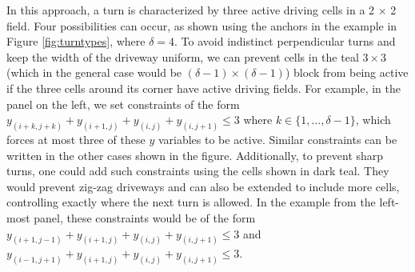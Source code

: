 \documentclass[10pt]{article}
\newcommand{\drivewidth}{\delta}
\theoremstyle{definition}
\begin{document}
In this approach, a turn is characterized by three active driving cells in a 2 $\times$ 2 field. Four possibilities can occur, as shown using the anchors in the example in Figure \ref{fig:turntypes}, where $\drivewidth = 4$. To avoid indistinct perpendicular turns and keep the width of the driveway uniform, we can prevent cells in the teal $3 \times 3$ (which in the general case would be $(\delta - 1)\times (\delta - 1)$) block from being active if the three cells around its corner have active driving fields. For example, in the panel on the left, we set constraints of the form $y_{(i + k, j + k)} + y_{(i+1,j)} + y_{(i, j)} + y_{(i,j+1)} \leq 3$ where $k \in \{1, \ldots, \delta - 1\}$, which forces at most three of these $y$ variables to be active. Similar constraints can be written in the other cases shown in the figure. Additionally, to prevent sharp turns, one could add such constraints using the cells shown in dark teal. They would prevent zig-zag driveways and can also be extended to include more cells, controlling exactly where the next turn is allowed. In the example from the left-most panel, these constraints would be of the form $y_{(i + 1, j - 1)} + y_{(i+1,j)} + y_{(i, j)} + y_{(i,j+1)} \leq 3$ and $y_{(i -1, j + 1)} + y_{(i+1,j)} + y_{(i, j)} + y_{(i,j+1)} \leq 3$.
\end{document}
